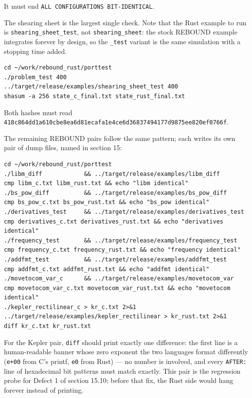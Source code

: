\documentclass[11pt]{article}
\begin{document}
It must end \texttt{ALL CONFIGURATIONS BIT-IDENTICAL}.

The shearing sheet is the largest single check. Note that the Rust example to run is \texttt{shearing\_sheet\_test}, not \texttt{shearing\_sheet}: the stock REBOUND example integrates forever by design, so the \texttt{\_test} variant is the same simulation with a stopping time added.

\begin{lstlisting}
cd ~/work/rebound_rust/porttest
./problem_test 400
../target/release/examples/shearing_sheet_test 400
shasum -a 256 state_c_final.txt state_rust_final.txt
\end{lstlisting}

Both hashes must read \texttt{418c864dd1a610cbe8ea6d81ecafa1e4ce6d36837494177d9875ee820ef0766f}.

The remaining REBOUND pairs follow the same pattern; each writes its own pair of dump files, named in section 15:

\begin{lstlisting}
cd ~/work/rebound_rust/porttest
./libm_diff            && ../target/release/examples/libm_diff
cmp libm_c.txt libm_rust.txt && echo "libm identical"
./bs_pow_diff          && ../target/release/examples/bs_pow_diff
cmp bs_pow_c.txt bs_pow_rust.txt && echo "bs_pow identical"
./derivatives_test     && ../target/release/examples/derivatives_test
cmp derivatives_c.txt derivatives_rust.txt && echo "derivatives identical"
./frequency_test       && ../target/release/examples/frequency_test
cmp frequency_c.txt frequency_rust.txt && echo "frequency identical"
./addfmt_test          && ../target/release/examples/addfmt_test
cmp addfmt_c.txt addfmt_rust.txt && echo "addfmt identical"
./movetocom_var_c      && ../target/release/examples/movetocom_var
cmp movetocom_var_c.txt movetocom_var_rust.txt && echo "movetocom identical"
./kepler_rectilinear_c > kr_c.txt 2>&1
../target/release/examples/kepler_rectilinear > kr_rust.txt 2>&1
diff kr_c.txt kr_rust.txt
\end{lstlisting}

For the Kepler pair, \texttt{diff} should print exactly one difference: the first line is a human-readable banner whose zero exponent the two languages format differently (\texttt{e+00} from C's printf, \texttt{e0} from Rust) --- no number is involved, and every \texttt{AFTER:} line of hexadecimal bit patterns must match exactly. This pair is the regression probe for Defect 1 of section 15.10; before that fix, the Rust side would hang forever instead of printing.
\end{document}
